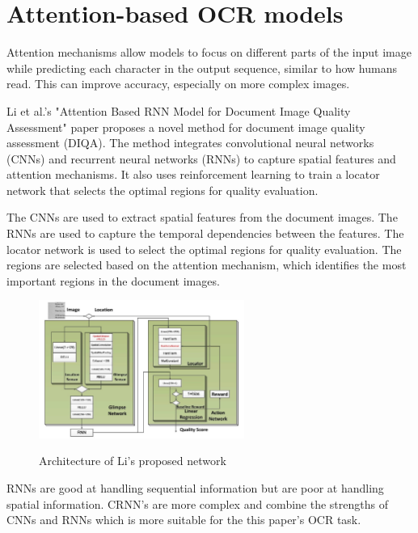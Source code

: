 \newpage

\section{Attention-based OCR models}

Attention mechanisms allow models to focus on different parts of the input image while predicting each character in the output sequence, similar to how humans read. This can improve accuracy, especially on more complex images.

Li et al.'s "Attention Based RNN Model for Document Image Quality Assessment" paper proposes a novel method for document image quality assessment (DIQA). The method integrates convolutional neural networks (CNNs) and recurrent neural networks (RNNs) to capture spatial features and attention mechanisms. It also uses reinforcement learning to train a locator network that selects the optimal regions for quality evaluation.

The CNNs are used to extract spatial features from the document images. The RNNs are used to capture the temporal dependencies between the features. The locator network is used to select the optimal regions for quality evaluation. The regions are selected based on the attention mechanism, which identifies the most important regions in the document images. \cite{liAttentionBasedRNN2017}


\begin{figure}[ht]
    \centering
    \includegraphics[width=0.6\textwidth]{Figures/AT_Li.jpg}
    \caption[Architecture of Li's proposed network]{Architecture of Li's proposed network}\cite{liAttentionBasedRNN2017}
    \label{fig:Li's Proposed Architecture}
\end{figure}

RNNs are good at handling sequential information but are poor at handling spatial information. CRNN's are more complex and combine the strengths of CNNs and RNNs which is more suitable for the this paper's OCR task.



